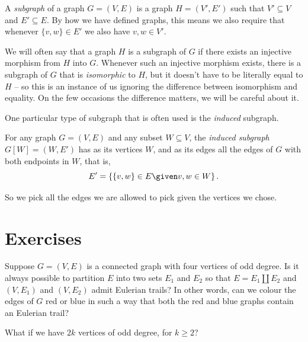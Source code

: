 \documentclass[nobib]{tufte-handout}
\begin{document}
\begin{definition}
  A \emph{subgraph} of a graph $G = (V,E)$ is a graph $H = (V', E')$ such that $V' \subseteq V$ and $E' \subseteq E$. By how we have defined graphs, this means we also require that whenever $\{v,w\} \in E'$ we also have $v, w \in V'$.

  We will often say that a graph $H$ is a subgraph of $G$ if there exists an injective morphism from $H$ into $G$. Whenever such an injective morphism exists, there is a subgraph of $G$ that is \emph{isomorphic} to $H$, but it doesn't have to be literally equal to $H$ -- so this is an instance of us ignoring the difference between isomorphism and equality. On the few occasions the difference matters, we will be careful about it.
\end{definition}

One particular type of subgraph that is often used is the \emph{induced} subgraph.

\begin{definition}
  For any graph $G = (V, E)$ and any subset $W \subseteq V$, the \emph{induced subgraph} $G[W] = (W, E')$ has as its vertices $W$, and as its edges all the edges of $G$ with both endpoints in $W$, that is,
  $$E' = \left\{\{v, w\} \in E \given v, w \in W\right\}.$$

  So we pick all the edges we are allowed to pick given the vertices we chose.
\end{definition}

\section{Exercises}

\begin{xca}
  Suppose $G = (V, E)$ is a connected graph with four vertices of odd degree. Is it always possible to partition $E$ into two sets $E_1$ and $E_2$ so that $E = E_1 \coprod E_2$ and $(V, E_1)$ and $(V,E_2)$ admit Eulerian trails? In other words, can we colour the edges of $G$ red or blue in such a way that both the red and blue graphs contain an Eulerian trail?

  What if we have $2k$ vertices of odd degree, for $k \geq 2$?
\end{xca}
\end{document}
